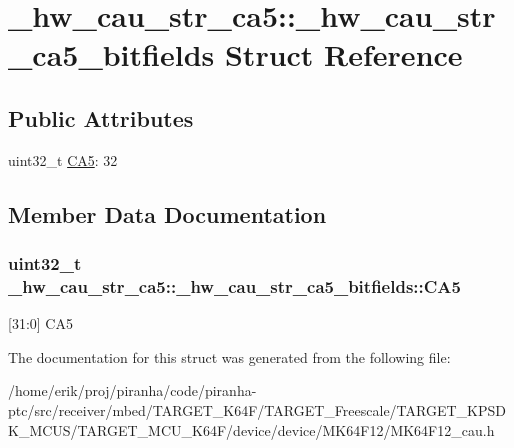 \hypertarget{struct__hw__cau__str__ca5_1_1__hw__cau__str__ca5__bitfields}{}\section{\+\_\+hw\+\_\+cau\+\_\+str\+\_\+ca5\+:\+:\+\_\+hw\+\_\+cau\+\_\+str\+\_\+ca5\+\_\+bitfields Struct Reference}
\label{struct__hw__cau__str__ca5_1_1__hw__cau__str__ca5__bitfields}
\subsection*{Public Attributes}
\begin{DoxyCompactItemize}
\item 
uint32\+\_\+t \hyperlink{struct__hw__cau__str__ca5_1_1__hw__cau__str__ca5__bitfields_aeb855d61071704790945c34da1aa0137}{C\+A5}\+: 32
\end{DoxyCompactItemize}


\subsection{Member Data Documentation}
\subsubsection[{\texorpdfstring{C\+A5}{CA5}}]{\setlength{\rightskip}{0pt plus 5cm}uint32\+\_\+t \+\_\+hw\+\_\+cau\+\_\+str\+\_\+ca5\+::\+\_\+hw\+\_\+cau\+\_\+str\+\_\+ca5\+\_\+bitfields\+::\+C\+A5}\hypertarget{struct__hw__cau__str__ca5_1_1__hw__cau__str__ca5__bitfields_aeb855d61071704790945c34da1aa0137}{}\label{struct__hw__cau__str__ca5_1_1__hw__cau__str__ca5__bitfields_aeb855d61071704790945c34da1aa0137}
\mbox{[}31\+:0\mbox{]} C\+A5 

The documentation for this struct was generated from the following file\+:\begin{DoxyCompactItemize}
\item 
/home/erik/proj/piranha/code/piranha-\/ptc/src/receiver/mbed/\+T\+A\+R\+G\+E\+T\+\_\+\+K64\+F/\+T\+A\+R\+G\+E\+T\+\_\+\+Freescale/\+T\+A\+R\+G\+E\+T\+\_\+\+K\+P\+S\+D\+K\+\_\+\+M\+C\+U\+S/\+T\+A\+R\+G\+E\+T\+\_\+\+M\+C\+U\+\_\+\+K64\+F/device/device/\+M\+K64\+F12/M\+K64\+F12\+\_\+cau.\+h\end{DoxyCompactItemize}
